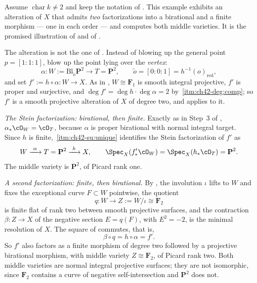 \begin{example}
\label{ex:ch42-second-factorization}
Assume $\operatorname{char}k\ne2$ and keep the notation of
.  This example exhibits an alteration of $X$ that
admits \emph{two} factorizations into a birational and a finite morphism ---
one in each order --- and computes both middle varieties.  It is the promised
illustration of  and of
.

The alteration is not the one of .  Instead of
blowing up the general point $p=[1:1:1]$, blow up the point lying over the
\emph{vertex}:
\[
 \alpha:W:=\mathrm{Bl}_{\tilde o}\mathbf P^2\longrightarrow T=\mathbf P^2,
 \qquad
 \tilde o=[0:0:1]=h^{-1}(o)_{\mathrm{red}},
\]
and set $f':=h\circ\alpha:W\to X$.  As in
, $W\cong\mathbf F_1$ is smooth integral
projective, $f'$ is proper and surjective, and
$\deg f'=\deg h\cdot\deg\alpha=2$ by
\,\cref{itm:ch42-deg:comp}; so $f'$ is a
smooth projective alteration of $X$ of degree two, and
 applies to it.

\emph{The Stein factorization: birational, then finite.}
Exactly as in Step~3 of , $\alpha_*\cO_W=\cO_T$,
because $\alpha$ is proper birational with normal integral target.  Since
$h$ is finite,
\,\cref{itm:ch42-su:unique} identifies the
Stein factorization of $f'$ as
\[
 W\xrightarrow{\ \alpha\ }T=\mathbf P^2\xrightarrow{\ h\ }X,
 \qquad
 \Spec_X(f'_*\cO_W)=\Spec_X(h_*\cO_T)=\mathbf P^2 .
\]
The middle variety is $\mathbf P^2$, of Picard rank one.

\emph{A second factorization: finite, then birational.}
By , the involution $\iota$ lifts to $W$ and
fixes the exceptional curve $F\subset W$ pointwise, the quotient
\[
 q:W\longrightarrow Z:=W/\iota\cong\mathbf F_2
\]
is finite flat of rank two between smooth projective surfaces, and the
contraction $\beta:Z\to X$ of the negative section $E=q(F)$, with
$E^2=-2$, is the minimal resolution of $X$.  The square of
 commutes, that is,
\[
 \beta\circ q=h\circ\alpha=f' .
\]
So $f'$ also factors as a finite morphism of degree two followed by a
projective birational morphism, with middle variety $Z\cong\mathbf F_2$,
of Picard rank two.  Both middle varieties are normal integral projective
surfaces; they are not isomorphic, since $\mathbf F_2$ contains a curve of
negative self-intersection and $\mathbf P^2$ does not.


\end{example}
